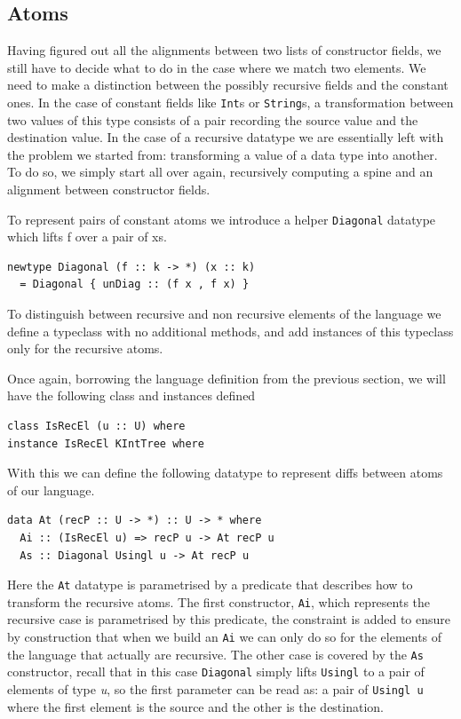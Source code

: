 \documentclass[11pt, titlepage]{article}
\begin{document}
\subsection{Atoms}\label{atoms}

Having figured out all the alignments between two lists of constructor
fields, we still have to decide what to do in the case where we match two
elements. We need to make a distinction between the possibly
recursive fields and the constant ones.
In the case of constant fields
like \texttt{Int}s or \texttt{String}s, a transformation between two
values of this type consists of a pair recording the source value and the
destination value. In the case of a recursive datatype we are
essentially left with the problem we started from: transforming a value
of a data type into another. To do so, we simply start all over again,
recursively computing a spine and an alignment between constructor
fields.

To represent pairs of constant atoms we introduce a helper \texttt{Diagonal} datatype which 
lifts f over a pair of xs.

\begin{verbatim}
newtype Diagonal (f :: k -> *) (x :: k) 
  = Diagonal { unDiag :: (f x , f x) }
\end{verbatim}

To distinguish between recursive and non recursive elements of the language we 
define a typeclass with no additional methods, and add instances of this typeclass only for the recursive atoms.

Once again, borrowing the language definition from the previous section, we will have the following 
class and instances defined
\begin{verbatim}
class IsRecEl (u :: U) where
instance IsRecEl KIntTree where
\end{verbatim}

With this we can define the following datatype to represent diffs between atoms of our language.
\begin{verbatim}
data At (recP :: U -> *) :: U -> * where
  Ai :: (IsRecEl u) => recP u -> At recP u
  As :: Diagonal Usingl u -> At recP u
\end{verbatim}

Here the \texttt{At} datatype is parametrised by a predicate that describes how 
to transform the recursive atoms. 
The first constructor, \texttt{Ai}, which represents the recursive case is 
parametrised by this predicate, the constraint is added to ensure by construction 
that when we build an \texttt{Ai} we can only do so for the elements of the 
language that actually are recursive.
The other case is covered by the \texttt{As} constructor, recall that in this case \texttt{Diagonal} simply lifts \texttt{Usingl} to a pair of elements of type \emph{u}, so the first parameter can be read as: a pair of \texttt{Usingl u} where the first element is the source and the other is the destination.
\end{document}
